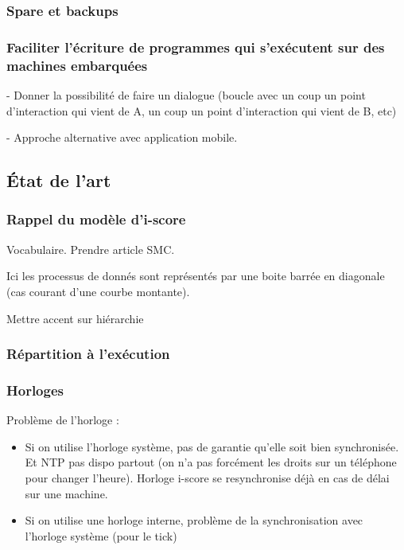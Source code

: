 \documentclass{article}
\newcommand\trigger{point d'interaction\xspace}
\begin{document}
\subsubsection{Spare et backups}
 
\subsubsection{Faciliter l'écriture de programmes qui s'exécutent sur des machines embarquées}
    

- Donner la possibilité de faire un dialogue (boucle avec un coup un \trigger qui vient de A, un coup un \trigger qui vient de B, etc)

- Approche alternative avec application mobile.

\subsection{État de l'art}
\subsubsection{Rappel du modèle d'i-score}
Vocabulaire. Prendre article SMC.

Ici les processus de donnés sont représentés par une boite barrée en diagonale (cas courant d'une courbe montante).

Mettre accent sur hiérarchie
\subsubsection{Répartition à l'exécution}


\subsubsection{Horloges}
Problème de l'horloge : 
\begin{itemize}
\item Si on utilise l'horloge système, pas de garantie qu'elle soit bien synchronisée. 
Et NTP pas dispo partout (on n'a pas forcément les droits sur un téléphone pour changer l'heure).
Horloge i-score se resynchronise déjà en cas de délai sur une machine.
\item Si on utilise une horloge interne, problème de la synchronisation avec l'horloge système (pour le tick)
\end{itemize}
\end{document}
